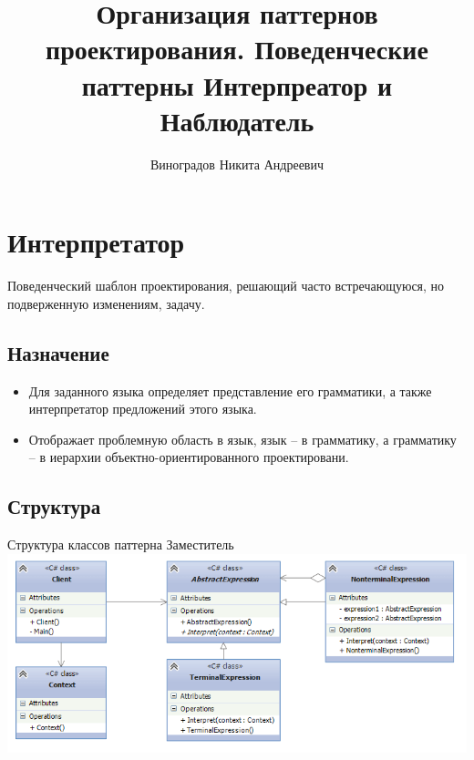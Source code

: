 \documentclass[PI,LAB]{HSEUniversity}
\title{Организация паттернов проектирования. Поведенческие  паттерны Интерпреатор и Наблюдатель}
\author{Виноградов Никита Андреевич}
\begin{document}
\maketitle


\chapter{Интерпретатор}
Поведенческий шаблон проектирования, решающий часто встречающуюся, но подверженную изменениям, задачу.
\section{Назначение}
\begin{itemize}
    \item Для заданного языка определяет представление его грамматики, а также интерпретатор предложений этого языка.
    \item Отображает проблемную область в язык, язык – в грамматику, а грамматику – в иерархии объектно-ориентированного проектировани.
\end{itemize}
\section{Структура}

\begin{FIGURE}[h]{Структура классов паттерна Заместитель\label{fig:example-figure}}
    \includegraphics[width=1\textwidth]{../out/interpreter}
\end{FIGURE}
\end{document}
